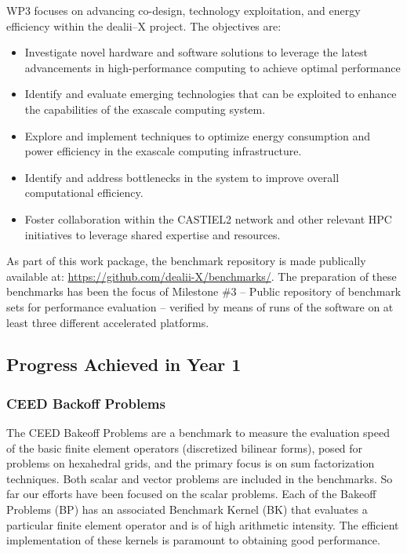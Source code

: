 \documentclass[a4paper,12pt, numbers]{article}
\begin{document}
WP3 focuses on advancing co-design, technology exploitation, and energy efficiency within the dealii--X project. The objectives are:

\begin{itemize}[left=1em, itemsep=0pt, topsep=0pt]
\item Investigate novel hardware and software solutions to leverage the latest advancements in high-performance computing to achieve optimal performance
\item Identify and evaluate emerging technologies that can be exploited to enhance the capabilities of the exascale computing system.
\item Explore and implement techniques to optimize energy consumption and power efficiency in the exascale computing infrastructure.
\item Identify and address bottlenecks in the system to improve overall computational efficiency.
\item Foster collaboration within the CASTIEL2 network and other relevant HPC initiatives to leverage shared expertise and resources.
\end{itemize}

As part of this work package, the benchmark repository is made publically available at: \url{https://github.com/dealii-X/benchmarks/}. The preparation of these benchmarks has been the focus of Milestone \#3 -- Public repository of benchmark sets for performance evaluation -- verified by means of runs of the software on at least three different accelerated platforms.


\subsection{Progress Achieved in Year 1} %

\subsubsection*{CEED Backoff Problems}

The CEED Bakeoff Problems are a benchmark to measure the evaluation speed of the basic finite element operators (discretized bilinear forms), posed for problems on hexahedral grids, and the primary focus is on sum factorization techniques.  Both scalar and vector problems are included in the benchmarks. So far our efforts have been focused on the scalar problems. Each of the Bakeoff Problems (BP) has an associated Benchmark Kernel (BK) that evaluates a particular finite element operator and is of high arithmetic intensity.  The efficient implementation of these kernels is paramount to obtaining good performance.
\end{document}
